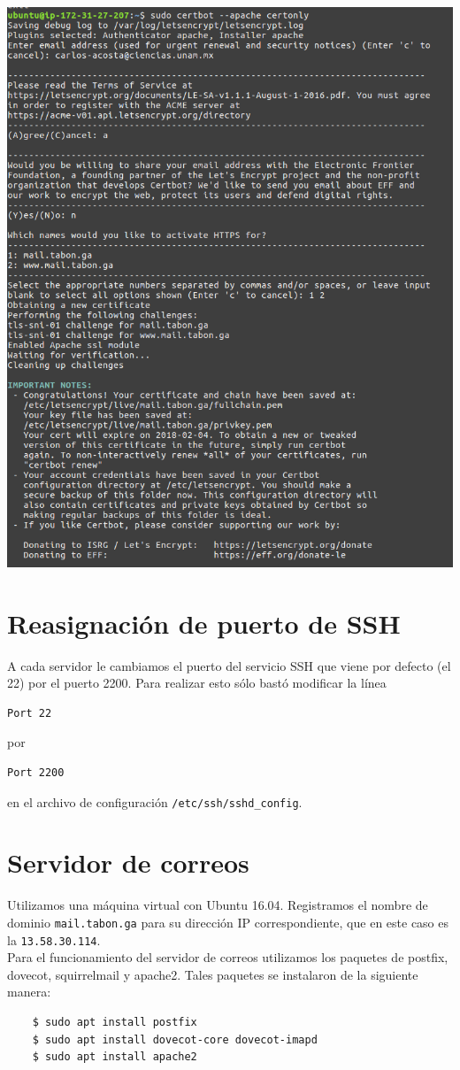 \documentclass[9pt]{article}
\begin{document}
\begin{center}
\includegraphics[scale=0.3]{mail/2}
\end{center}

\section{Reasignación de puerto de SSH}
A cada servidor le cambiamos el puerto del servicio \textsf{SSH} que viene por defecto (el 22) por el puerto 2200. Para realizar esto sólo bastó modificar la línea
\begin{verbatim}
Port 22
\end{verbatim}
por
\begin{verbatim}
Port 2200
\end{verbatim}
en el archivo de configuración \texttt{/etc/ssh/sshd\_config}.
\section{Servidor de correos}

Utilizamos una máquina virtual con Ubuntu 16.04. Registramos el nombre de dominio \texttt{mail.tabon.ga} para su dirección IP correspondiente, que en este caso es la \texttt{13.58.30.114}. \\
Para el funcionamiento del servidor de correos utilizamos los paquetes de \textsf{postfix}, \textsf{dovecot}, \textsf{squirrelmail} y \textsf{apache2}. Tales paquetes se instalaron de la siguiente manera: \\
\begin{verbatim}
    $ sudo apt install postfix
    $ sudo apt install dovecot-core dovecot-imapd
    $ sudo apt install apache2
\end{verbatim}
\end{document}

